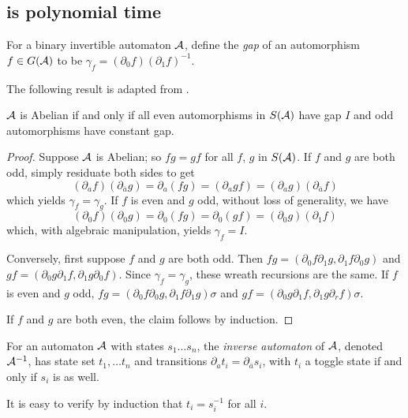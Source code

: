 \documentclass[11pt, titlepage]{article}
\begin{document}

\subsection{ is polynomial time}

For a binary invertible automaton $\mathcal{A}$, define the \emph{gap} of an
automorphism $f \in G(\mathcal{A})$ to be
$\gamma_f = (\partial_0 f)(\partial_1 f)^{-1}$.

The following result is adapted from \cite{okano:thesis}.

\begin{lemma}
$\mathcal{A}$ is Abelian if and only if all even automorphisms
in $S(\mathcal{A})$ have gap $I$ and odd automorphisms have constant gap.
\end{lemma}

\begin{proof}
Suppose $\mathcal{A}$ is Abelian; so $fg = gf$ for all $f$, $g$ in $S(\mathcal{A})$.
If $f$ and $g$ are both odd, simply residuate both sides to get
\[
  (\partial_a f)(\partial_{\bar{a}}g) =
  \partial_a (fg) =
  (\partial_a gf) =
  (\partial_a g)(\partial_{\bar{a}}f)
\]
which yields $\gamma_f = \gamma_g$. If $f$ is even and $g$ odd, without loss of generality, we have
\[
  (\partial_0f)(\partial_0 g) = 
  \partial_0(fg) =
  \partial_0(gf) =
  (\partial_0g)(\partial_1 f)
\]
which, with algebraic manipulation, yields $\gamma_f = I$.

Conversely, first suppose $f$ and $g$ are both odd. Then
$fg = (\partial_0 f \partial_1 g, \partial_1 f \partial_0 g)$ and
$gf = (\partial_0 g \partial_1 f, \partial_1 g \partial_0 f)$. Since
$\gamma_f = \gamma_g$, these wreath recursions are the same. If $f$ is
even and $g$ odd,
$fg = (\partial_0f \partial_0g, \partial_1 f \partial_1 g)\sigma$ and
$gf = (\partial_0g \partial_1f, \partial_1 g \partial_r f)\sigma$.

If $f$ and $g$ are both even, the claim follows by induction.
\end{proof}

\begin{definition}
  For an automaton $\mathcal{A}$ with states $s_1 \ldots s_n$, the
  \emph{inverse automaton} of $\mathcal{A}$, denoted $\mathcal{A}^{-1}$, has state set
  $t_1, \ldots t_n$ and transitions
  $\partial_a t_i = \partial_{\bar{a}} s_i$, with $t_i$ a toggle state
  if and only if $s_i$ is as well.
\end{definition}

It is easy to verify by induction that $t_i = s_i^{-1}$ for all $i$.
\end{document}
